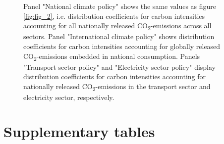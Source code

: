 \documentclass[12pt, a4paper]{article}
\newenvironment{subcaption2}
{\strut
\vspace{-5pt}
\begin{minipage}[b]{0.9\textwidth}
  \hspace*{-\parindent}
  \footnotesize}
 {\end{minipage}}
\begin{document}
\begin{refsection}
\begin{figure}[ht!]
\begin{subcaption2}
    Panel "National climate policy" shows the same values as figure \ref{fig:fig_2}, i.e. distribution coefficients for carbon intensities accounting for all nationally released CO\textsubscript{2}-emissions across all sectors. Panel "International climate policy" shows distribution coefficients for carbon intensities accounting for globally released CO\textsubscript{2}-emissions embedded in national consumption. Panels "Transport sector policy" and "Electricity sector policy" display distribution coefficients for carbon intensities accounting for nationally released CO\textsubscript{2}-emissions in the transport sector and electricity sector, respectively.
    \end{subcaption2}
\end{figure}

\clearpage

\section{Supplementary tables} \label{sec:tables}


\clearpage


\clearpage


\clearpage


\clearpage


\clearpage


\clearpage


\clearpage

%   



\clearpage


\clearpage


\clearpage


\clearpage


\clearpage


\clearpage

\begin{refcontext}[sorting=nyt]
\printbibliography[heading=subbibliography, title ={References (Appendix)}]
\end{refcontext}
\end{refsection}
\end{document}
